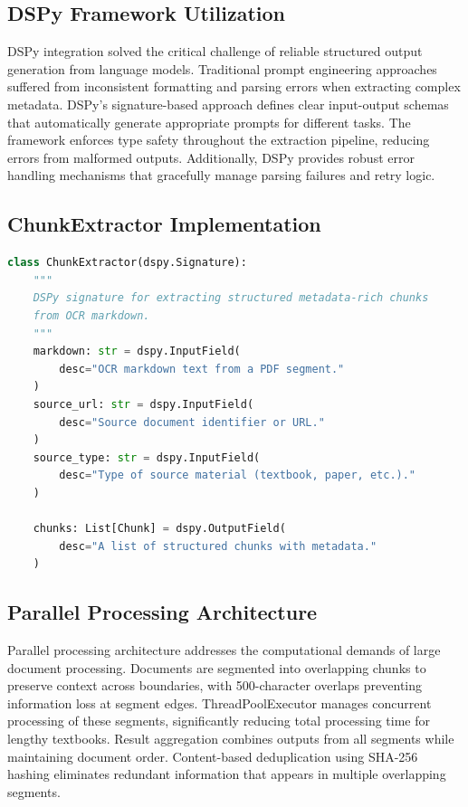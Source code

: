 \documentclass[12pt]{article}
\begin{document}
\subsection{DSPy Framework Utilization}

DSPy integration solved the critical challenge of reliable structured output generation from language models. Traditional prompt engineering approaches suffered from inconsistent formatting and parsing errors when extracting complex metadata. DSPy's signature-based approach defines clear input-output schemas that automatically generate appropriate prompts for different tasks. The framework enforces type safety throughout the extraction pipeline, reducing errors from malformed outputs. Additionally, DSPy provides robust error handling mechanisms that gracefully manage parsing failures and retry logic.

\subsection{ChunkExtractor Implementation}

\begin{lstlisting}[language=Python, caption=DSPy Signature for Chunk Extraction]
class ChunkExtractor(dspy.Signature):
    """
    DSPy signature for extracting structured metadata-rich chunks
    from OCR markdown.
    """
    markdown: str = dspy.InputField(
        desc="OCR markdown text from a PDF segment."
    )
    source_url: str = dspy.InputField(
        desc="Source document identifier or URL."
    )
    source_type: str = dspy.InputField(
        desc="Type of source material (textbook, paper, etc.)."
    )

    chunks: List[Chunk] = dspy.OutputField(
        desc="A list of structured chunks with metadata."
    )
\end{lstlisting}

\subsection{Parallel Processing Architecture}

Parallel processing architecture addresses the computational demands of large document processing. Documents are segmented into overlapping chunks to preserve context across boundaries, with 500-character overlaps preventing information loss at segment edges. ThreadPoolExecutor manages concurrent processing of these segments, significantly reducing total processing time for lengthy textbooks. Result aggregation combines outputs from all segments while maintaining document order. Content-based deduplication using SHA-256 hashing eliminates redundant information that appears in multiple overlapping segments.
\end{document}
